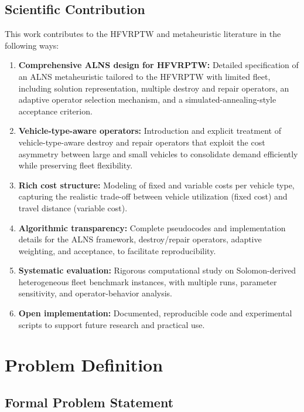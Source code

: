 \documentclass[11pt]{article}
\begin{document}
\subsection{Scientific Contribution}

This work contributes to the HFVRPTW and metaheuristic literature in the following ways:

\begin{enumerate}[leftmargin=*]
    \item \textbf{Comprehensive ALNS design for HFVRPTW:} Detailed specification of an ALNS metaheuristic tailored to the HFVRPTW with limited fleet, including solution representation, multiple destroy and repair operators, an adaptive operator selection mechanism, and a simulated-annealing-style acceptance criterion.
    \item \textbf{Vehicle-type-aware operators:} Introduction and explicit treatment of vehicle-type-aware destroy and repair operators that exploit the cost asymmetry between large and small vehicles to consolidate demand efficiently while preserving fleet flexibility.
    \item \textbf{Rich cost structure:} Modeling of fixed and variable costs per vehicle type, capturing the realistic trade-off between vehicle utilization (fixed cost) and travel distance (variable cost).
    \item \textbf{Algorithmic transparency:} Complete pseudocodes and implementation details for the ALNS framework, destroy/repair operators, adaptive weighting, and acceptance, to facilitate reproducibility.
    \item \textbf{Systematic evaluation:} Rigorous computational study on Solomon-derived heterogeneous fleet benchmark instances, with multiple runs, parameter sensitivity, and operator-behavior analysis.
    \item \textbf{Open implementation:} Documented, reproducible code and experimental scripts to support future research and practical use.
\end{enumerate}

\section{Problem Definition}

\subsection{Formal Problem Statement}
\end{document}

